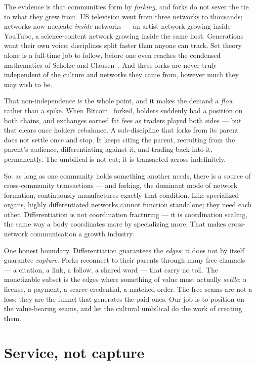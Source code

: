 \documentclass[11pt]{article}
\begin{document}
The evidence is that communities form by \emph{forking}, and forks do not sever the tie to what they grew from. US television went from three networks to thousands; networks now nucleate \emph{inside} networks --- an artist network growing inside YouTube, a science-content network growing inside the same host. Generations want their own voice; disciplines split faster than anyone can track. Set theory alone is a full-time job to follow, before one even reaches the condensed mathematics of Scholze and Clausen~\cite{condensed}. And these forks are never truly independent of the culture and networks they came from, however much they may wish to be.

That non-independence is the whole point, and it makes the demand a \emph{flow} rather than a spike. When Bitcoin~\cite{nakamoto} forked, holders suddenly had a position on both chains, and exchanges earned fat fees as traders played both sides --- but that clears once holders rebalance. A sub-discipline that forks from its parent does not settle once and stop. It keeps citing the parent, recruiting from the parent's audience, differentiating against it, and trading back into it, permanently. The umbilical is not cut; it is transacted across indefinitely.

\begin{keybox}
So: as long as one community holds something another needs, there is a source of cross-community transactions --- and forking, the dominant mode of network formation, continuously manufactures exactly that condition. Like specialized organs, highly differentiated networks cannot function standalone; they need each other. Differentiation is not coordination fracturing --- it is coordination scaling, the same way a body coordinates more by specializing more. That makes cross-network communication a growth industry.
\end{keybox}

One honest boundary. Differentiation guarantees the \emph{edges}; it does not by itself guarantee \emph{capture}. Forks reconnect to their parents through many free channels --- a citation, a link, a follow, a shared word --- that carry no toll. The monetizable subset is the edges where something of value must actually \emph{settle}: a license, a payment, a scarce credential, a matched order. The free seams are not a loss; they are the funnel that generates the paid ones. Our job is to position on the value-bearing seams, and let the cultural umbilical do the work of creating them.

\section{Service, not capture}\label{sec:service}
\end{document}
